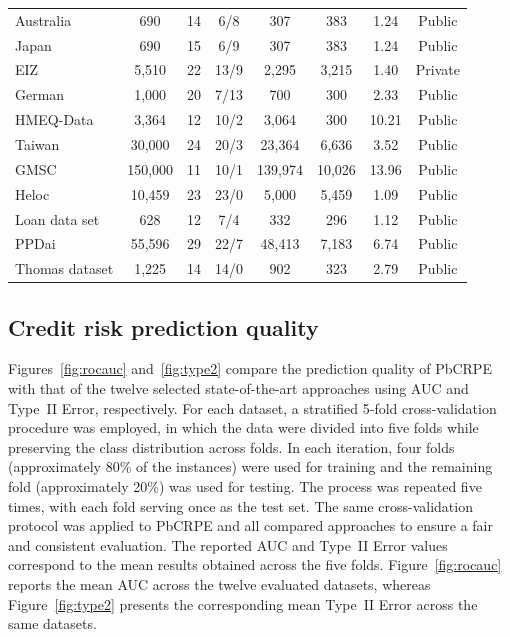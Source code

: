 {\begin{table}[H]
{\begin{tabular}{lccccccc}
				Australia      &     690   & 14 & 6/8   &     307  &    383  &  1.24  & Public  \\
				Japan          &     690   & 15 & 6/9   &     307  &    383  &  1.24  & Public  \\
				EIZ            &   5,510   & 22 & 13/9  &   2,295  &  3,215  &  1.40  & Private \\
				German         &   1,000   & 20 & 7/13  &     700  &    300  &  2.33  & Public  \\
				HMEQ-Data      &   3,364   & 12 & 10/2  &   3,064  &    300  & 10.21  & Public  \\
				Taiwan         &  30,000   & 24 & 20/3  &  23,364  &  6,636  &  3.52  & Public  \\ %
				GMSC           & 150,000   & 11 & 10/1  & 139,974  & 10,026  & 13.96  & Public  \\
				Heloc          &  10,459   & 23 & 23/0  &   5,000  &  5,459  &  1.09  & Public  \\
				Loan data set  &     628   & 12 & 7/4   &     332  &    296  &  1.12  & Public  \\
				PPDai          &  55,596   & 29 & 22/7  &  48,413  &  7,183  &  6.74  & Public  \\
				Thomas dataset &   1,225   & 14 & 14/0  &     902  &    323  &  2.79  & Public  \\
				\hline
		\end{tabular}}
	\end{table}
\subsection{Credit risk prediction quality}

Figures~\ref{fig:rocauc} and~\ref{fig:type2} compare the prediction quality of PbCRPE with that of the twelve selected state-of-the-art approaches using AUC and Type~II Error, respectively. For each dataset, a stratified 5-fold cross-validation procedure was employed, in which the data were divided into five folds while preserving the class distribution across folds. In each iteration, four folds (approximately 80\% of the instances) were used for training and the remaining fold (approximately 20\%) was used for testing. The process was repeated five times, with each fold serving once as the test set. The same cross-validation protocol was applied to PbCRPE and all compared approaches to ensure a fair and consistent evaluation. The reported AUC and Type~II Error values correspond to the mean results obtained across the five folds. Figure~\ref{fig:rocauc} reports the mean AUC across the twelve evaluated datasets, whereas Figure~\ref{fig:type2} presents the corresponding mean Type~II Error across the same datasets.\newline

}
